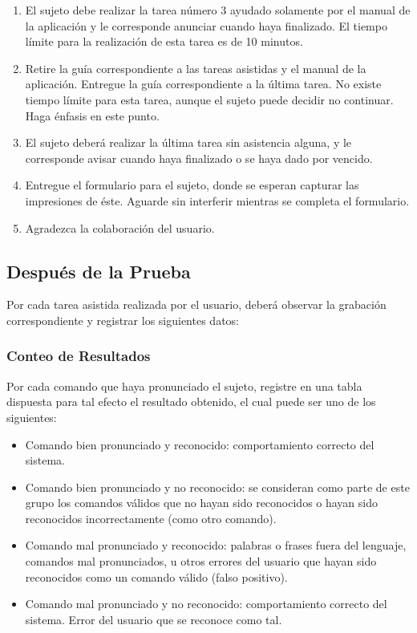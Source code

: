 \begin{enumerate}
    \item El sujeto debe realizar la tarea n\'umero 3 ayudado solamente por el manual de la aplicaci\'on 
    y le corresponde anunciar cuando haya finalizado. El tiempo l\'imite para la realizaci\'on de esta 
    tarea es de 10 minutos.
    \item Retire la gu\'ia correspondiente a las tareas asistidas y el manual de la aplicaci\'on. 
    Entregue la gu\'ia correspondiente a la \'ultima tarea. No existe tiempo l\'imite para esta tarea, 
    aunque el sujeto puede decidir no continuar. Haga \'enfasis en este punto.
    \item El sujeto deber\'a realizar la \'ultima tarea  sin asistencia alguna, y le corresponde avisar 
    cuando haya finalizado o se haya dado por vencido.
    \item Entregue el formulario para el sujeto, donde se esperan capturar las 
    impresiones de \'este. Aguarde sin interferir mientras se completa el formulario.
    \item Agradezca la colaboraci\'on del usuario.
\end{enumerate}


\subsection{Despu\'es de la Prueba}

 Por cada tarea asistida realizada por el usuario, deber\'a observar la grabaci\'on correspondiente y registrar los siguientes datos:

\subsubsection{Conteo de Resultados}

Por cada comando que haya pronunciado el sujeto, registre en una tabla dispuesta para tal efecto el resultado obtenido, el cual puede ser uno de los siguientes:
\begin{itemize}
    \item Comando bien pronunciado y reconocido: comportamiento correcto del sistema.
    \item Comando bien pronunciado y no reconocido: se consideran como parte de este grupo los comandos 
    v\'alidos que no hayan sido reconocidos o hayan sido reconocidos incorrectamente (como otro comando).
    \item Comando mal pronunciado y reconocido: palabras o frases fuera del lenguaje, comandos mal 
    pronunciados, u otros errores del usuario que hayan sido reconocidos como un comando v\'alido (falso 
    positivo).
    \item Comando mal pronunciado y no reconocido: comportamiento correcto del sistema. Error del usuario 
    que se reconoce como tal.
\end{itemize}

